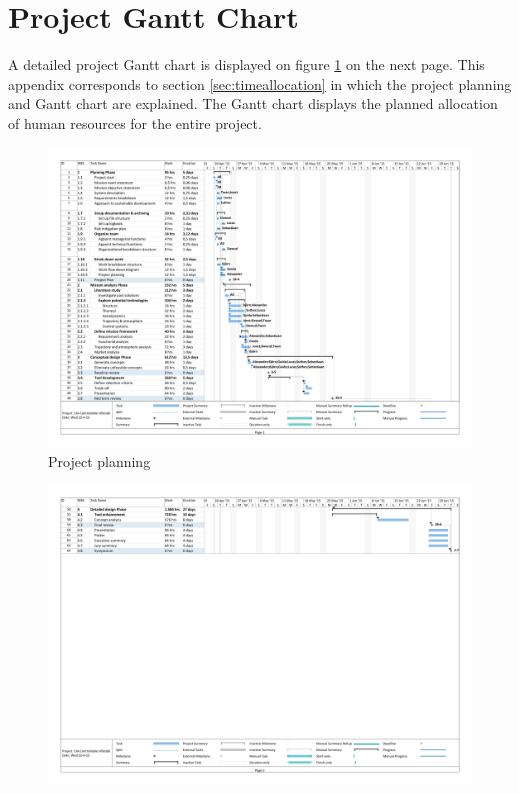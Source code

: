 \section{Project Gantt Chart}

A detailed project Gantt chart is displayed on figure \ref{fig:GanttChart} on the next page. This appendix corresponds to section \ref{sec:timeallocation} in which the project planning and Gantt chart are explained. The Gantt chart displays the planned allocation of human resources for the entire project.

\begin{figure}
    \includegraphics[scale=0.6]{Figure/1_GanttChart.pdf}
    \caption{Project planning}
    \label{fig:GanttChart}
\end{figure}

\begin{figure}
    \includegraphics[scale=0.6]{Figure/2_GanttChart.pdf}
\end{figure}
